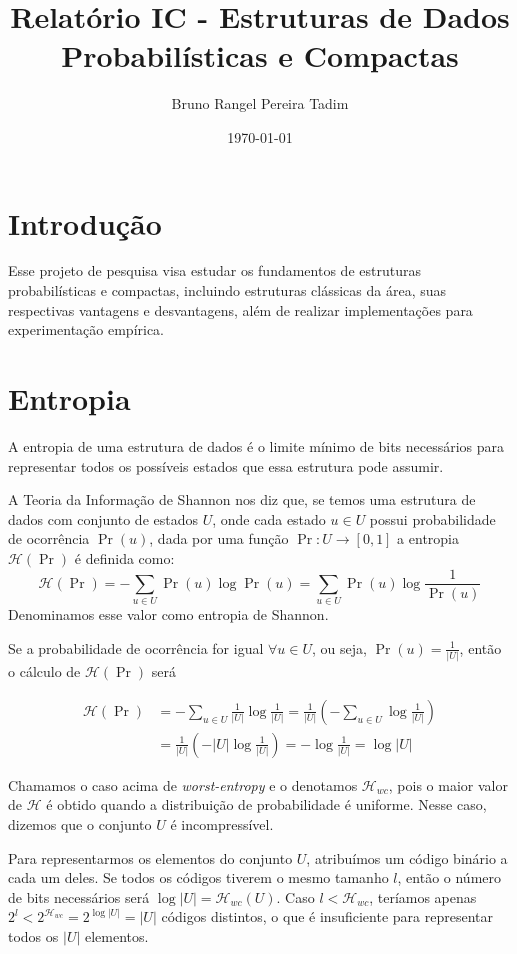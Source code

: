 \documentclass[a4paper, 12pt, english, brazilian]{article}
\title{Relatório IC - Estruturas de Dados Probabilísticas e Compactas}
\author{Bruno Rangel Pereira Tadim}
\date{\today}
\begin{document}
\maketitle

\section{Introdução}
Esse projeto de pesquisa visa estudar os fundamentos de estruturas probabilísticas e compactas, 
incluindo estruturas clássicas da área, suas respectivas vantagens e desvantagens, além de realizar implementações
para experimentação empírica.

\section{Entropia}
A entropia de uma estrutura de dados é o limite mínimo de bits necessários para representar 
todos os possíveis estados que essa estrutura pode assumir.

A Teoria da Informação de Shannon nos diz que, se temos uma estrutura de dados com conjunto 
de estados $U$, onde cada estado $u \in U$ possui probabilidade de ocorrência $\Pr(u)$, dada por uma função $\Pr : U \to [0, 1]$
a entropia $\mathcal{H}(\Pr)$ é definida como:
\[
    \mathcal{H}(\Pr) = -\sum_{u \in U}{\Pr(u)\log\Pr(u)} = \sum_{u \in U}{\Pr(u)\log\frac{1}{\Pr(u)}}
\]
Denominamos esse valor como entropia de Shannon.

Se a probabilidade de ocorrência for igual $\forall u \in U$, ou seja, $\Pr(u) = \frac{1}{|U|}$, 
então o cálculo de $\mathcal{H}(\Pr)$ será

\begin{align*}
    \mathcal{H}(\Pr) &= -\sum_{u \in U}{\frac{1}{|U|}\log\frac{1}{|U|}} 
    = \frac{1}{|U|} \left(-\sum_{u \in U}{\log\frac{1}{|U|}}\right)\\
    &= \frac{1}{|U|} \left( -|U| \log\frac{1}{|U|} \right) = -\log\frac{1}{|U|} = \log|U|
\end{align*}

Chamamos o caso acima de \textit{worst-entropy} e o denotamos $\mathcal{H}_{wc}$, pois o maior valor de $\mathcal{H}$ é
obtido quando a distribuição de probabilidade é uniforme.  Nesse caso, dizemos que o 
conjunto $U$ é incompressível.

Para representarmos os elementos do conjunto $U$, atribuímos um código binário a cada um deles.
Se todos os códigos tiverem o mesmo tamanho $l$, então o número de bits necessários será 
$\log|U| = \mathcal{H}_{wc}(U)$. Caso $l <\mathcal{H}_{wc}$, teríamos apenas $2^{l} < 2^{\mathcal{H}_{wc}}
= 2^{\log|U|} = |U|$ códigos distintos, o que é insuficiente para representar todos os $|U|$ elementos.
\end{document}

